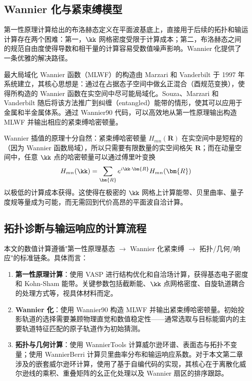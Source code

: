 \subsection{Wannier 化与紧束缚模型}

第一性原理计算给出的布洛赫态定义在平面波基底上，直接用于后续的拓扑和输运计算存在两个困难：第一，$\kk$ 网格密度受限于计算成本；第二，布洛赫态之间的规范自由度使得导数和相干量的计算容易受数值噪声影响。Wannier 化提供了一条优雅的解决路径。

最大局域化 Wannier 函数（MLWF）的构造由 Marzari 和 Vanderbilt 于 1997 年系统建立\cite{wannier1}，其核心思想是：通过在占据态子空间中做幺正混合（酉规范变换），使得所构造的 Wannier 函数在实空间中尽可能局域化。Souza、Marzari 和 Vanderbilt 随后将该方法推广到纠缠（entangled）能带的情形\cite{wannier2}，使其可以应用于金属和半金属体系。通过 Wannier90 代码\cite{pizzi2020wannier90}，可以高效地从第一性原理输出构造 MLWF 并输出相应的紧束缚哈密顿量。

Wannier 插值的原理十分自然：紧束缚哈密顿量 $H_{mn}(\bm{R})$ 在实空间中是短程的（因为 Wannier 函数局域），所以只需要有限数量的实空间格矢 $\bm{R}$；而在动量空间中，任意 $\kk$ 点的哈密顿量可以通过傅里叶变换
\begin{equation}
  H_{mn}(\kk) = \sum_{\bm{R}} e^{i\kk\cdot\bm{R}} H_{mn}(\bm{R})
\end{equation}
以极低的计算成本获得。这使得在极密的 $\kk$ 网格上计算能带、贝里曲率、量子度规等量成为可能，而无需回到代价高昂的平面波自洽计算。

\subsection{拓扑诊断与输运响应的计算流程}
\label{subsec:workflow}

本文的数值计算遵循"第一性原理基态 $\rightarrow$ Wannier 化紧束缚 $\rightarrow$ 拓扑/几何/响应"的标准链条。具体而言：

\begin{enumerate}
  \item \textbf{第一性原理计算}：使用 VASP\cite{vasp1,vasp2} 进行结构优化和自洽场计算，获得基态电子密度和 Kohn-Sham 能带。关键参数包括截断能、$\kk$ 点网格密度、自旋轨道耦合的处理方式等，视具体材料而定。
  \item \textbf{Wannier 化}：使用 Wannier90\cite{pizzi2020wannier90} 构造 MLWF 并输出紧束缚哈密顿量。初始投影轨道的选择需要兼顾物理直觉和数值稳定性——通常选取与目标能窗内的主要轨道特征匹配的原子轨道作为初始猜测。
  \item \textbf{拓扑与几何计算}：使用 WannierTools\cite{WU2018405} 计算威尔逊环谱、表面态与拓扑不变量；使用 WannierBerri\cite{wannierberri} 计算贝里曲率分布和输运响应系数。对于本文第二章涉及的嵌套威尔逊环计算，使用了基于自编代码的实现，其核心在于离散化威尔逊线的乘积、重叠矩阵的幺正化处理以及 Wannier 扇区的排序跟踪。
\end{enumerate}

